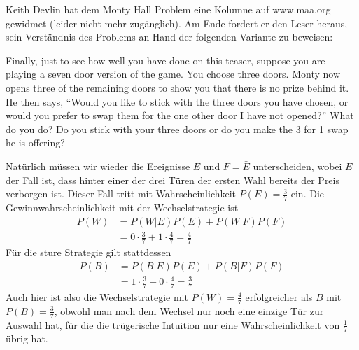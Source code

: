 Keith Devlin hat dem Monty Hall Problem eine Kolumne auf www.maa.org
gewidmet (leider nicht mehr zugänglich). Am Ende
fordert er den Leser heraus, sein Verständnis des Problems an
Hand der folgenden Variante zu beweisen:
\medskip

Finally, just to see how well you have done on this teaser, suppose
you are playing a seven door version of the game. You choose three
doors. Monty now opens three of the remaining doors to show you
that there is no prize behind it. He then says, ``Would you like to
stick with the three doors you have chosen, or would you prefer to
swap them for the one other door I have not opened?'' What do you
do? Do you stick with your three doors or do you make the 3 for 1
swap he is offering?

\begin{loesung}
Natürlich müssen wir wieder die Ereignisse $E$ und $F=\bar E$ unterscheiden,
wobei $E$ der Fall ist, dass hinter einer der drei Türen der ersten Wahl
bereits der Preis verborgen ist.  Dieser Fall tritt mit Wahrscheinlichkeit
$P(E)=\frac37$ ein.
Die Gewinnwahrscheinlichkeit mit der Wechselstrategie ist
\begin{align*}
P(W)&=P(W|E)P(E)+P(W|F)P(F)\\
&=0\cdot \frac37+1\cdot\frac47=\frac47
\end{align*}
Für die sture Strategie gilt stattdessen
\begin{align*}
P(B)&=P(B|E)P(E)+P(B|F)P(F)\\
&=1\cdot \frac37+0\cdot\frac47=\frac37
\end{align*}
Auch hier ist also die Wechselstrategie mit $P(W)=\frac47$
erfolgreicher als $B$ mit $P(B)=\frac37$, obwohl man
nach dem Wechsel nur noch eine einzige Tür zur Auswahl hat, für
die die trügerische Intuition nur eine Wahrscheinlichkeit von
$\frac17$ übrig hat.
\end{loesung}

